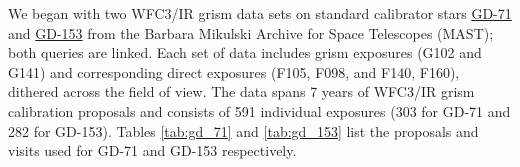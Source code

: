 \documentclass[12pt]{article}
\begin{document}
{{    We began with two WFC3/IR grism data sets on standard calibrator stars
    \href{http://archive.stsci.edu/hst/search.php?action=Search&sci_instrume=WFC3&sci_targname=GD-71&sci_pep_id=11552,11926,11936,12333,12357,12702,13092,13579,14024,14386&sci_aper_1234=IR,G*}{
        \color{blue} GD-71} and
    \href{http://archive.stsci.edu/hst/search.php?action=Search&sci_instrume=WFC3&sci_targname=GD-153&sci_pep_id=11552,11926,11936,12333,12357,12702,13092,13579,14024,14386&sci_aper_1234=IR,G*}{
        \color{blue} GD-153} from the 
Barbara Mikulski Archive for Space Telescopes (MAST); both queries are linked. Each set of 
data includes grism exposures (G102 and G141) and corresponding direct exposures (F105, F098, and F140, F160), 
dithered across the field of view. The data spans 7 years of WFC3/IR grism calibration proposals and consists of 
591 individual exposures (303 for GD-71 and 282 for GD-153). Tables \ref{tab:gd_71} and \ref{tab:gd_153} list the proposals and visits
used for GD-71 and GD-153 respectively. 

}}
\end{document}
